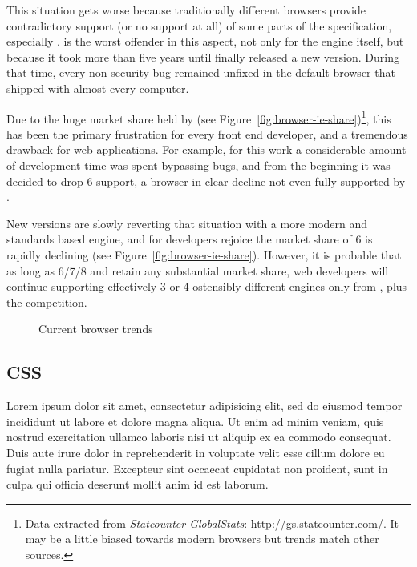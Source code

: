 This situation gets worse because traditionally different browsers provide contradictory support (or no support at all) of some parts of the specification, especially .
 is the worst offender in this aspect, not only for the engine itself, but because it took more than five years until  finally released a new version.
During that time, every non security bug remained unfixed in the default browser that shipped with almost every computer.

Due to the huge market share held by  (see Figure~\ref{fig:browser-ie-share})\footnote{Data extracted from \emph{Statcounter GlobalStats}: \url{http://gs.statcounter.com/}. It may be a little biased towards modern browsers but trends match other sources.}, this has been the primary frustration for every front end developer, and a tremendous drawback for web applications.
For example, for this work a considerable amount of development time was spent bypassing  bugs, and from the beginning it was decided to drop 6 support, a browser in clear decline not even fully supported by .

New  versions are slowly reverting that situation with a more modern and standards based engine, and for developers rejoice the market share of 6 is rapidly declining (see Figure~\ref{fig:browser-ie-share}).
However, it is probable that as long as 6/7/8 and  retain any substantial market share, web developers will continue supporting effectively 3 or 4 ostensibly different engines only from , plus the competition.

\begin{figure}[htbp]
  \centering
  \label{fig:browser-trends}
  \caption{Current browser trends}
\end{figure}


\subsection{CSS} %
\label{sub:css}

Lorem ipsum dolor sit amet, consectetur adipisicing elit, sed do eiusmod tempor incididunt ut labore et dolore magna aliqua. Ut enim ad minim veniam, quis nostrud exercitation ullamco laboris nisi ut aliquip ex ea commodo consequat. Duis aute irure dolor in reprehenderit in voluptate velit esse cillum dolore eu fugiat nulla pariatur. Excepteur sint occaecat cupidatat non proident, sunt in culpa qui officia deserunt mollit anim id est laborum.

